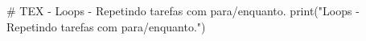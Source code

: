 # TEX - Loops - Repetindo tarefas com para/enquanto.
print("Loops - Repetindo tarefas com para/enquanto.")
